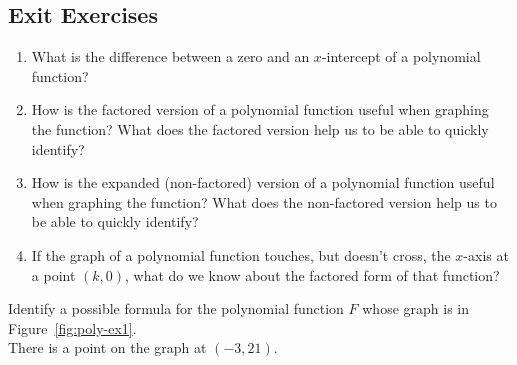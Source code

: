  \newpage

\subsection*{Exit Exercises} \label{exit-functions-polynomial-graphs}

\begin{myExit}
	\begin{enumerate}
		\item What is the difference between a zero and an $x$-intercept of a polynomial function?
		\vfill
		\item How is the factored version of a polynomial function useful when graphing the function?  What does the factored version help us to be able to quickly identify?
		\vfill
		\item How is the expanded (non-factored) version of a polynomial function useful when graphing the function?  What does the non-factored version help us to be able to quickly identify?
		\vfill
		\item If the graph of a polynomial function touches, but doesn't cross, the $x$-axis at a point $(k,0)$, what do we know about the factored form of that function?
		\vfill
	\end{enumerate}
\end{myExit}

\begin{myExit}
Identify a possible formula for the polynomial function $F$ whose graph is in Figure~\ref{fig:poly-ex1}.\\
There is a point on the graph at $(-3,21)$.\\
\begin{minipage}{0.6\linewidth}
~
\end{minipage}
\begin{minipage}{0.4\linewidth}
	\begin{center}
	~\\[-0.8em]
		\label{fig:poly-ex1}
	\end{center}
\end{minipage}

\end{myExit}


